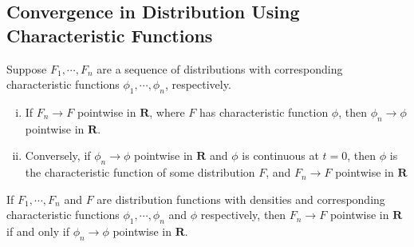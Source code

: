 \subsection{Convergence in Distribution Using Characteristic Functions}
\begin{theorem}\label{thm:conv-char-dist}
	Suppose $F_{1}, \cdots, F_{n}$ are a sequence of distributions
	with corresponding characteristic functions
	$\phi_{1}, \cdots, \phi_{n}$, respectively. 
	\begin{enumerate}[(i)]
		\item If $F_{n} \to F$ pointwise in $\mathbf{R}$,
			where $F$ has characteristic function
			$\phi$, then $\phi_{n} \to \phi$ pointwise in $\mathbf{R}$.
		\item Conversely, if  $\phi_{n} \to \phi$ pointwise in $\mathbf{R}$ and 
			$\phi$ is continuous at $t = 0$, then $\phi$ is the characteristic
			function of some distribution $F$, and $F_{n} \to F$ pointwise
			in $\mathbf{R}$
	\end{enumerate}
\end{theorem}
\begin{corollary}
	If $F_{1}, \cdots, F_{n}$ and $F$ are distribution functions with densities
	and corresponding characteristic functions $\phi_{1}, \cdots, \phi_{n}$ and
	$\phi$ respectively, then $F_{n} \to F$ pointwise in $\mathbf{R}$ if and only if
	$\phi_{n} \to \phi$ pointwise in $\mathbf{R}$.
\end{corollary}
